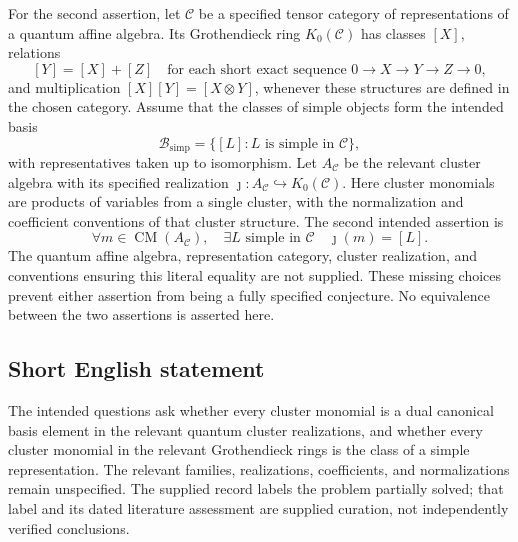 \documentclass[11pt]{article}
\begin{document}
For the second assertion, let \(\mathcal C\) be a specified tensor category of representations of a quantum affine algebra. Its Grothendieck ring \(K_0(\mathcal C)\) has classes \([X]\), relations
\[
[Y]=[X]+[Z]\quad\text{for each short exact sequence }0\longrightarrow X\longrightarrow Y\longrightarrow Z\longrightarrow0,
\]
and multiplication \([X][Y]=[X\otimes Y]\), whenever these structures are defined in the chosen category. Assume that the classes of simple objects form the intended basis
\[
\mathcal B_{\mathrm{simp}}=\{[L]:L\text{ is simple in }\mathcal C\},
\]
with representatives taken up to isomorphism. Let \(A_{\mathcal C}\) be the relevant cluster algebra with its specified realization \(\jmath:A_{\mathcal C}\hookrightarrow K_0(\mathcal C)\). Here cluster monomials are products of variables from a single cluster, with the normalization and coefficient conventions of that cluster structure. The second intended assertion is
\[
\forall m\in\operatorname{CM}(A_{\mathcal C}),\quad
\exists L\text{ simple in }\mathcal C\quad
\jmath(m)=[L].
\]
The quantum affine algebra, representation category, cluster realization, and conventions ensuring this literal equality are not supplied. These missing choices prevent either assertion from being a fully specified conjecture. No equivalence between the two assertions is asserted here.
\subsection{Short English statement}
The intended questions ask whether every cluster monomial is a dual canonical basis element in the relevant quantum cluster realizations, and whether every cluster monomial in the relevant Grothendieck rings is the class of a simple representation. The relevant families, realizations, coefficients, and normalizations remain unspecified. The supplied record labels the problem partially solved; that label and its dated literature assessment are supplied curation, not independently verified conclusions.
\end{document}
